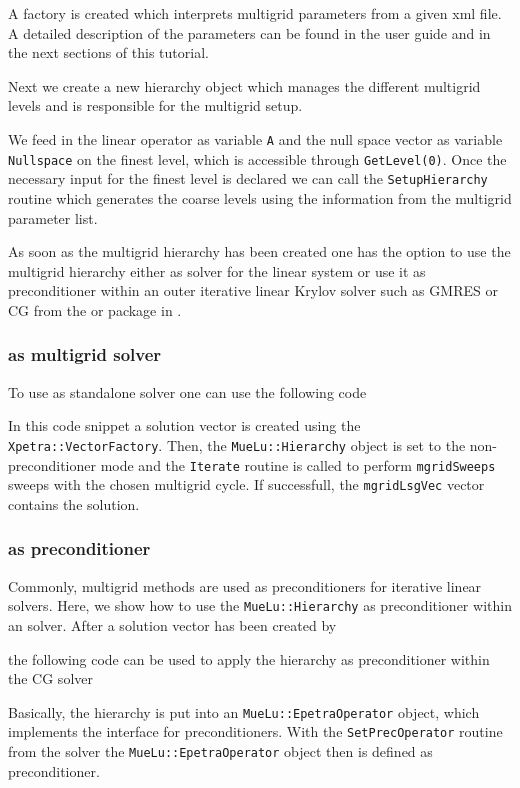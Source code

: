 \documentclass{article}
\begin{document}
A \muelu factory is created which interprets multigrid parameters from a given xml file. A detailed description of the parameters can be found in the \muelu user guide and in the next sections of this tutorial.


Next we create a new \muelu hierarchy object which manages the different multigrid levels and is responsible for the multigrid setup.

We feed in the linear operator as variable \texttt{A} and the null space vector as variable \texttt{Nullspace} on the finest level, which is accessible through \texttt{GetLevel(0)}.
Once the necessary input for the finest level is declared we can call the \texttt{SetupHierarchy} routine which generates the coarse levels using the information from the multigrid parameter list.

As soon as the multigrid hierarchy has been created one has the option to use the multigrid hierarchy either as solver for the linear system or use it as preconditioner within an outer iterative linear Krylov solver such as GMRES or CG from the \aztecoo or \belos package in \trilinos.

\subsubsection{\muelu as multigrid solver}
To use \muelu as standalone solver one can use the following code

In this code snippet a solution vector is created using the \texttt{Xpetra::VectorFactory}. Then, the \texttt{MueLu::Hierarchy} object is set to the non-preconditioner mode and the \texttt{Iterate} routine is called
to perform \texttt{mgridSweeps} sweeps with the chosen multigrid cycle. If successfull, the \texttt{mgridLsgVec} vector contains the solution.

\subsubsection{\muelu as preconditioner}
Commonly, multigrid methods are used as preconditioners for iterative linear solvers. Here, we show how to use the \texttt{MueLu::Hierarchy} as preconditioner within an \aztecoo solver.
After a solution vector has been created by 

the following code can be used to apply the \muelu hierarchy as preconditioner within the \aztecoo CG solver

Basically, the \muelu hierarchy is put into an \texttt{MueLu::EpetraOperator} object, which implements the \epetra interface for preconditioners.
With the \texttt{SetPrecOperator} routine from the \aztecoo solver the \texttt{MueLu::EpetraOperator} object then is defined as preconditioner.
\end{document}
